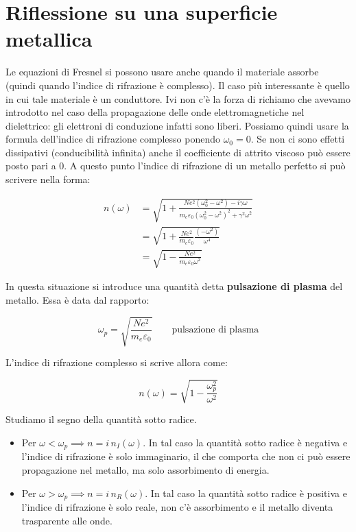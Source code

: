 \section{Riflessione su una superficie metallica}

Le equazioni di Fresnel si possono usare anche quando il materiale assorbe (quindi quando l'indice di rifrazione è complesso). Il caso più interessante è quello in cui tale materiale è un conduttore. Ivi non c'è la forza di richiamo che avevamo introdotto nel caso della propagazione delle onde elettromagnetiche nel dielettrico: gli elettroni di conduzione infatti sono liberi. Possiamo quindi usare la formula dell'indice di rifrazione complesso ponendo $\omega_0=0$. Se non ci sono effetti dissipativi (conducibilità infinita) anche il coefficiente di attrito viscoso può essere posto pari a $0$. A questo punto l'indice di rifrazione di un metallo perfetto si può scrivere nella forma:

\begin{align*}
	n(\omega) &= \sqrt{1+\frac{Ne^2 (\omega_0^2 -\omega^2)-i\gamma \omega}{m_e\varepsilon_0 (\omega_0^2 -\omega^2)^2 + \gamma^2 \omega^2}} \tag*{$\gamma=0,\omega_0=0$}\\
	&= \sqrt{1+\frac{Ne^2}{m_e\varepsilon_0}\frac{(-\omega^2)}{\omega^4}}\\
	&= \sqrt{1-\frac{Ne^2}{m_e\varepsilon_0 \omega^2}}
\end{align*}

In questa situazione si introduce una quantità detta \textbf{pulsazione di plasma} del metallo. Essa è data dal rapporto:

\[
	\omega_p = \sqrt{\frac{Ne^2}{m_e\varepsilon_0}} \qquad \text{pulsazione di plasma}
\]

L'indice di rifrazione complesso si scrive allora come:

\[
	n(\omega) = \sqrt{1-\frac{\omega_p^2}{\omega^2}}
\]

Studiamo il segno della quantità sotto radice.

\begin{itemize}
	\item Per $\omega<\omega_p\implies n=i\,n_I(\omega)$. In tal caso la quantità sotto radice è negativa e l'indice di rifrazione è solo immaginario, il che comporta che non ci può essere propagazione nel metallo, ma solo assorbimento di energia.
	\item Per $\omega>\omega_p\implies n=i\,n_R(\omega)$. In tal caso la quantità sotto radice è positiva e l'indice di rifrazione è solo reale, non c'è assorbimento e il metallo diventa trasparente alle onde.
\end{itemize}

